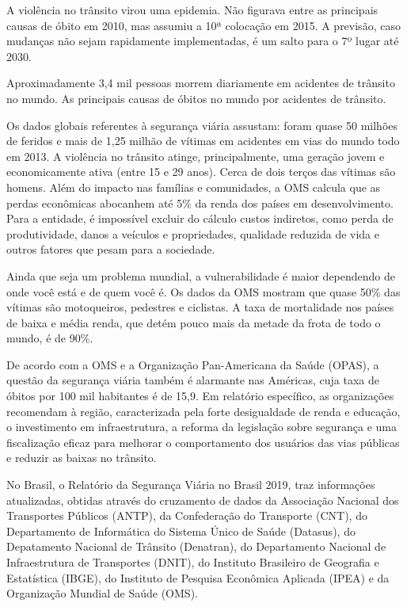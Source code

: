 \documentclass[output=paper,colorlinks,citecolor=green]{langscibook}
\begin{document}
A violência no trânsito virou uma epidemia. Não figurava entre as principais causas de óbito em 2010, mas assumiu a 10ª colocação em 2015. A previsão, caso mudanças não sejam rapidamente implementadas, é um salto para o 7º lugar até 2030.\vskip0.3cm

Aproximadamente 3,4 mil pessoas morrem diariamente em acidentes de trânsito no mundo. As principais causas de óbitos no mundo por acidentes de trânsito.\vskip0.3cm

Os dados globais referentes à segurança viária assustam: foram quase 50 milhões de feridos e mais de 1,25 milhão de vítimas em acidentes em vias do mundo todo em 2013. A violência no trânsito atinge, principalmente, uma geração jovem e economicamente ativa (entre 15 e 29 anos). Cerca de dois terços das vítimas são homens. Além do impacto nas famílias e comunidades, a OMS calcula que as perdas econômicas abocanhem até 5\% da renda dos países em desenvolvimento. Para a entidade, é impossível excluir do cálculo custos indiretos, como perda de produtividade, danos a veículos e propriedades, qualidade reduzida de vida e outros fatores que pesam para a sociedade.\vskip0.3cm

Ainda que seja um problema mundial, a vulnerabilidade é maior dependendo de onde você está e de quem você é. Os dados da OMS mostram que quase 50\% das vítimas são motoqueiros, pedestres e ciclistas. A taxa de mortalidade nos países de baixa e média renda, que detém pouco mais da metade da frota de todo o mundo, é de 90\%.\vskip0.3cm

De acordo com a OMS e a Organização Pan-Americana da Saúde (OPAS), a questão da segurança viária também é alarmante nas Américas, cuja taxa de óbitos por 100 mil habitantes é de 15,9. Em relatório específico, as organizações recomendam à região, caracterizada pela forte desigualdade de renda e educação, o investimento em infraestrutura, a reforma da legislação sobre segurança e uma fiscalização eficaz para melhorar o comportamento dos usuários das vias públicas e reduzir as baixas no trânsito.\vskip0.3cm

No Brasil, o Relatório da Segurança Viária no Brasil 2019,  traz informações atualizadas, obtidas através do cruzamento de dados da Associação Nacional dos Transportes Públicos (ANTP), da Confederação do Transporte (CNT), do Departamento de Informática do Sistema Único de Saúde (Datasus), do Depatamento Nacional de Trânsito (Denatran), do Departamento Nacional de Infraestrutura de Transportes (DNIT), do Instituto Brasileiro de Geografia e Estatística (IBGE), do Instituto de Pesquisa Econômica Aplicada (IPEA) e da Organização Mundial de Saúde (OMS).\vskip0.3cm
\end{document}

